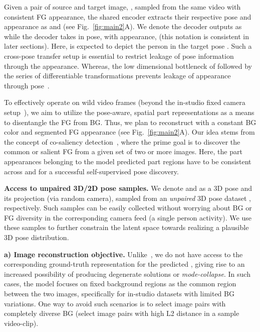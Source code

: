 Given a pair of source and target image, , sampled from the same video \ie with consistent FG appearance, the shared encoder extracts their respective pose and appearance as  and  (see Fig.~\ref{fig:main2}{\color{red}A}). We denote the decoder outputs as  while the decoder takes in pose,  with appearance,  (this notation is consistent in later sections). Here,  is expected to depict the person in the target pose . Such a cross-pose transfer setup is essential to restrict leakage of pose information 
through the appearance. Whereas, the low dimensional bottleneck of  followed by the series of differentiable transformations prevents leakage of appearance through pose~\cite{jakab2018unsupervised}. 

To effectively operate on wild video frames (\ie beyond the in-studio fixed camera setup~\cite{rhodin2018unsupervised, jakab2018unsupervised}), we aim to utilize the pose-aware, spatial part representations as a means to disentangle the FG from BG. Thus, we plan to reconstruct  with a constant BG color  and segmented FG appearance (see Fig.~\ref{fig:main2}{\color{red}A}). Our idea stems from the concept of co-saliency detection~\cite{zhang2016co,hsu2018unsupervised}, where the prime goal is to discover the common or salient FG from a given set of two or more images. Here, the part appearances belonging to the model predicted part regions have to be consistent across  and  for a successful self-supervised pose discovery.




\textbf{Access to unpaired 3D/2D pose samples.} We denote  and  as a 3D pose and its projection (via random camera), sampled from an \textit{unpaired} 3D pose dataset , respectively. 
Such samples can be easily collected without worrying about BG or FG diversity in the corresponding camera feed (\ie a single person activity). We use these samples to further
constrain the latent space towards realizing a plausible 3D pose distribution.


\vspace{1mm}\noindent
\textbf{a) Image reconstruction objective.} 
Unlike~\cite{rhodin2018unsupervised,jakab2018unsupervised}, we do not have access to the corresponding ground-truth representation for the predicted , giving rise to an increased possibility of producing degenerate solutions or \textit{mode-collapse}. In such cases, the model focuses on fixed background regions as the common region between the two images, specifically for in-studio datasets with limited BG variations. One way to avoid such scenarios is to select image pairs with completely diverse BG (\ie select image pairs with high L2 distance in a sample video-clip). 

